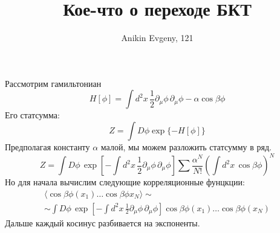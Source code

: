 \documentclass{article}
\title{Кое-что о переходе БКТ}
\author{Anikin Evgeny, 121}
\newcommand{\bra}{\langle}
\newcommand{\ket}{\rangle}
\newcommand{\p}{\partial}
\begin{document}
\maketitle
Рассмотрим гамильтониан
\begin{equation}
	H[\phi] = \int d^2x\, \frac{1}{2} \p_\mu \phi\, \p_\mu \phi - \alpha \cos{\beta \phi}
\end{equation}
Его статсумма:
\begin{equation}
	Z = \int D\phi \exp\{-H[\phi]\}
\end{equation}
Предполагая константу $\alpha$ малой, мы можем разложить статсумму в ряд.
\begin{equation}
	Z = \int D\phi\,\exp{\left[-\int d^2x\, \frac{1}{2} \p_\mu \phi\, \p_\mu \phi\right]}
			\sum \frac{\alpha^N}{N!}	\left(\int d^2x \, \cos{\beta \phi}\right)^N
\end{equation}
Но для начала вычислим следующие корреляционные фунцкции:
\begin{multline}
	\bra \cos{\beta \phi(x_1)} \dots \cos{\beta \phi{x_N}} \ket \sim \\ 
	\sim	\int D\phi \, \exp{\left[-\int d^2x\, \frac{1}{2} \p_\mu \phi\, \p_\mu \phi\right]}
		\cos{\beta \phi(x_1)} \dots \cos{\beta \phi({x_N})}
\end{multline}
Дальше каждый косинус разбивается на экспоненты.
\end{document}

